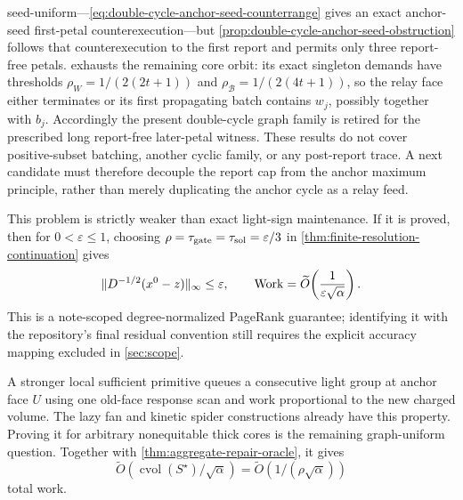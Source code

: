 seed-uniform---\cref{eq:double-cycle-anchor-seed-counterrange} gives an exact
anchor-seed first-petal counterexecution---but
\cref{prop:double-cycle-anchor-seed-obstruction} follows that counterexecution
to the first report and permits only three report-free petals.
 exhausts the remaining core
orbit: its exact singleton demands have thresholds
$\rho_W=1/(2(2t+1))$ and
$\rho_{\mathcal B}=1/(2(4t+1))$, so the relay face either terminates or its
first propagating batch contains $w_j$, possibly together with $b_j$.
Accordingly the present double-cycle graph family is retired for the
prescribed long report-free later-petal witness.  These results do not cover
positive-subset batching, another cyclic family, or any post-report trace.
A next candidate must therefore decouple the report cap from the anchor
maximum principle, rather than merely duplicating the anchor cycle as a relay
feed.

This problem is strictly weaker than exact light-sign maintenance.  If it is
proved, then for $0<\varepsilon\leq1$, choosing
$\rho=\tau_{\rm gate}=\tau_{\rm sol}=\varepsilon/3$ in
\cref{thm:finite-resolution-continuation} gives
\begin{equation}
 \|D^{-1/2}(x^0-z)\|_\infty\leq\varepsilon,
 \qquad
 \operatorname{Work}=\widetilde O\!\left(\frac1{\varepsilon\sqrt\alpha}\right).
 \label{eq:finite-resolution-product}
\end{equation}
This is a note-scoped degree-normalized PageRank guarantee; identifying it
with the repository's final residual convention still requires the explicit
accuracy mapping excluded in \cref{sec:scope}.

A stronger local sufficient primitive queues a consecutive light group at
anchor face $U$ using one old-face response scan and work proportional to the new charged
volume.  The lazy fan and kinetic spider constructions already have this
property.  Proving it for arbitrary nonequitable thick cores is the remaining
graph-uniform question.  Together with \cref{thm:aggregate-repair-oracle}, it
gives
\begin{equation}
 \widetilde O(\operatorname{cvol}(S^\star)/\sqrt\alpha)
 =\widetilde O(1/(\rho\sqrt\alpha))
 \label{eq:aggregate-product-consequence}
\end{equation}
total work.
